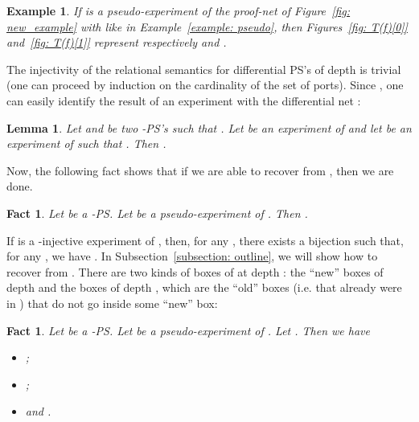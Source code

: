 \documentclass{article}
\theoremstyle{plain}
\newtheorem{example}{Example}
\newtheorem{lem}[theorem]{Lemma}
\newtheorem{fact}[theorem]{Fact}
\newcommand{\scalefacteight}{0.30}
\newcommand{\picteight}[1]{\scalebox{\scalefacteight}{}}
\newcommand{\scalefactfive}{0.4}
\newcommand{\pictfive}[1]{\scalebox{\scalefactfive}{}}
\begin{document}
\begin{figure*}\pictfive{T_f_0_csl}
\caption{}
\label{fig: T(f)[0]}
\end{figure*}

\begin{figure*}\picteight{T_f_1_bis}
\caption{}
\label{fig: T(f)[1]}
\end{figure*}


\begin{example}
If  is a pseudo-experiment of the proof-net  of Figure~\ref{fig: new_example} with  like in Example~\ref{example: pseudo}, then Figures~\ref{fig: T(f)[0]} and~\ref{fig: T(f)[1]} represent respectively  and .
\end{example}



The injectivity of the relational semantics for differential PS's of depth  is trivial (one can proceed by induction on the cardinality of the set of ports). Since , one can easily identify the result  of an experiment  with the differential net :

\begin{lem}\label{lem: taylor expansion}
Let  and  be two -PS's such that . Let  be an experiment of  and let  be an experiment of  such that . Then .
\end{lem}


Now, the following fact shows that 
if we are able to recover  from , then we are done.


\begin{fact}\label{fact: Taylor[i] with i large}
Let  be a -PS. Let  be a pseudo-experiment of . Then .
\end{fact}

\begin{comment}
\begin{proof}
Just notice that  and .
\end{proof}
\end{comment}


If  is a -injective experiment of , then, for any , there exists a bijection  such that, for any , we have  . In Subsection~\ref{subsection: outline}, we will show how to recover   from . There are two kinds of boxes of  at depth : the ``new'' boxes of depth  and the boxes of depth , which are the ``old'' boxes (i.e. that already were in ) that do not go inside some ``new'' box:

\begin{fact}\label{fact : boxes of taylor{e}{i+1} of depth < i}
Let  be a -PS. Let  be a pseudo-experiment of . Let . Then we have 
\begin{itemize}
\item ;
\item ; 
\item and .
\end{itemize}
\end{fact}
\end{document}
